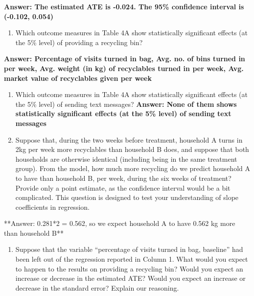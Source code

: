 \documentclass[
]{article}
\providecommand{\tightlist}{%
  \setlength{\itemsep}{0pt}\setlength{\parskip}{0pt}}
\begin{document}
\textbf{Answer: The estimated ATE is -0.024. The 95\% confidence
interval is (-0.102, 0.054)}

\begin{enumerate}
\def\labelenumi{\arabic{enumi}.}
\setcounter{enumi}{2}
\tightlist
\item
  Which outcome measures in Table 4A show statistically significant
  effects (at the 5\% level) of providing a recycling bin?
\end{enumerate}

\textbf{Answer: Percentage of visits turned in bag, Avg. no. of bins
turned in per week, Avg. weight (in kg) of recyclables turned in per
week, Avg. market value of recyclables given per week}

\begin{enumerate}
\def\labelenumi{\arabic{enumi}.}
\setcounter{enumi}{3}
\item
  Which outcome measures in Table 4A show statistically significant
  effects (at the 5\% level) of sending text messages? \textbf{Answer:
  None of them shows statistically significant effects (at the 5\%
  level) of sending text messages}
\item
  Suppose that, during the two weeks before treatment, household A turns
  in 2kg per week more recyclables than household B does, and suppose
  that both households are otherwise identical (including being in the
  same treatment group). From the model, how much more recycling do we
  predict household A to have than household B, per week, during the six
  weeks of treatment? Provide only a point estimate, as the confidence
  interval would be a bit complicated. This question is designed to test
  your understanding of slope coefficients in regression.
\end{enumerate}

**Answer: 0.281*2 = 0.562, so we expect household A to have 0.562 kg
more than household B**

\begin{enumerate}
\def\labelenumi{\arabic{enumi}.}
\setcounter{enumi}{5}
\tightlist
\item
  Suppose that the variable ``percentage of visits turned in bag,
  baseline'' had been left out of the regression reported in Column 1.
  What would you expect to happen to the results on providing a
  recycling bin? Would you expect an increase or decrease in the
  estimated ATE? Would you expect an increase or decrease in the
  standard error? Explain our reasoning.
\end{enumerate}
\end{document}
